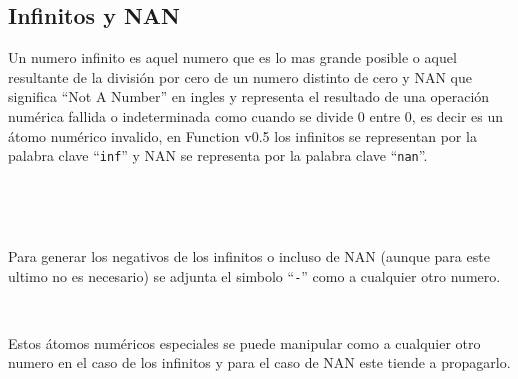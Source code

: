       \subsection{Infinitos y NAN}
      Un numero infinito es aquel numero que es lo mas grande posible o aquel resultante de la división por cero de un numero distinto de cero y NAN que significa ``Not A Number'' en ingles y representa el resultado de una operación numérica fallida o indeterminada como cuando se divide 0 entre 0, es decir es un átomo numérico invalido, en Function v0.5 los infinitos se representan por la palabra clave ``\texttt{inf}'' y NAN se representa por la palabra clave ``\texttt{nan}''.
      
      \begin{fxcode}
      \end{fxcode}
      
      \begin{fxcode}
      \end{fxcode}
      
      \begin{fxcode}
      \end{fxcode}
      
      \begin{fxcode}
         \\
      \end{fxcode}
      
      \begin{fxcode}
         \\
      \end{fxcode}
      
      Para generar los negativos de los infinitos o incluso de NAN (aunque para este ultimo no es necesario) se adjunta el simbolo ``\texttt{-}'' como a cualquier otro numero.
      
      \begin{fxcode}
      \end{fxcode}
      
      \begin{fxcode}
         \\
      \end{fxcode}
      
      Estos átomos numéricos especiales se puede manipular como a cualquier otro numero en el caso de los infinitos y para el caso de NAN este tiende a propagarlo.
      
